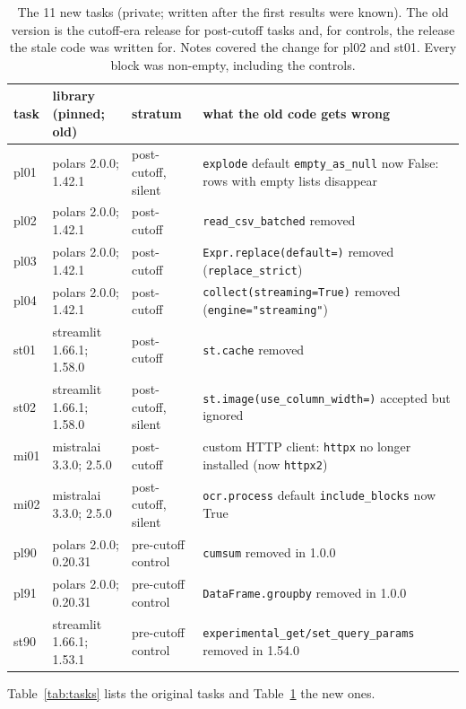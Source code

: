 \documentclass[11pt]{article}
\newcommand{\code}[1]{\texttt{#1}}
\begin{document}
\begin{table}[t]
\begin{tabular}{lll>{\raggedright\arraybackslash}p{7.2cm}}
\toprule
task & library (pinned; old) & stratum & what the old code gets wrong \\
\midrule
pl01 & polars 2.0.0; 1.42.1 & post-cutoff, silent & \code{explode} default \code{empty\_as\_null} now False: rows with empty lists disappear \\
pl02 & polars 2.0.0; 1.42.1 & post-cutoff & \code{read\_csv\_batched} removed \\
pl03 & polars 2.0.0; 1.42.1 & post-cutoff & \code{Expr.replace(default=)} removed (\code{replace\_strict}) \\
pl04 & polars 2.0.0; 1.42.1 & post-cutoff & \code{collect(streaming=True)} removed (\code{engine="streaming"}) \\
st01 & streamlit 1.66.1; 1.58.0 & post-cutoff & \code{st.cache} removed \\
st02 & streamlit 1.66.1; 1.58.0 & post-cutoff, silent & \code{st.image(use\_column\_width=)} accepted but ignored \\
mi01 & mistralai 3.3.0; 2.5.0 & post-cutoff & custom HTTP client: \code{httpx} no longer installed (now \code{httpx2}) \\
mi02 & mistralai 3.3.0; 2.5.0 & post-cutoff, silent & \code{ocr.process} default \code{include\_blocks} now True \\
\midrule
pl90 & polars 2.0.0; 0.20.31 & pre-cutoff control & \code{cumsum} removed in 1.0.0 \\
pl91 & polars 2.0.0; 0.20.31 & pre-cutoff control & \code{DataFrame.groupby} removed in 1.0.0 \\
st90 & streamlit 1.66.1; 1.53.1 & pre-cutoff control & \code{experimental\_get/set\_query\_params} removed in 1.54.0 \\
\bottomrule
\end{tabular}
\caption{The 11 new tasks (private; written after the first results were known). The old version is the cutoff-era release for post-cutoff tasks and, for controls, the release the stale code was written for. Notes covered the change for pl02 and st01. Every block was non-empty, including the controls.}
\label{tab:newtasks}
\end{table}

Table~\ref{tab:tasks} lists the original tasks and Table~\ref{tab:newtasks} the new ones.
\end{document}
